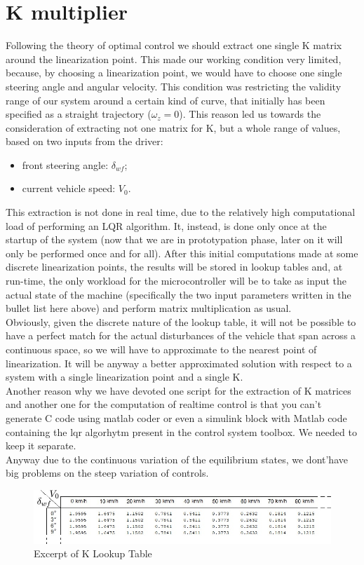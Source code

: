 \section{K multiplier}
Following the theory of optimal control we should extract one single K matrix around the linearization point. This made our working condition very limited, because, by choosing a linearization point, we would have to choose one single steering angle and angular velocity. This condition was restricting the validity range of our system around a certain kind of curve, that initially has been specified as a straight trajectory ($\omega_{z}=0$).
This reason led us towards the consideration of extracting not one matrix for K, but a whole range of values, based on two inputs from the driver:
\begin{itemize}
	\item front steering angle: $\delta_{wf}$;
	\item current vehicle speed: $V_0$.
\end{itemize}	
This extraction is not done in real time, due to the relatively high computational load of performing an LQR algorithm. It, instead, is done only once at the startup of the system (now that we are in prototypation phase, later on it will only be performed once and for all). After this initial computations made at some discrete linearization points, the results will be stored in lookup tables and, at run-time, the only workload for the microcontroller will be to take as input the actual state of the machine (specifically the two input parameters written in the bullet list here above) and perform matrix multiplication as usual.\\
Obviously, given the discrete nature of the lookup table, it will not be possible to have a perfect match for the actual disturbances of the vehicle that span across a continuous space, so we will have to approximate to the nearest point of linearization. It will be anyway a better approximated solution with respect to a system with a single linearization point and a single K.\\
Another reason why we have devoted one script for the extraction of K matrices and another one for the computation of realtime control is that you can't generate C code using matlab coder or even a simulink block with Matlab code containing the lqr algorhytm present in the control system toolbox. We needed to keep it separate.\\
Anyway due to the continuous variation of the equilibrium states, we dont'have big problems on the steep variation of controls.
\begin{figure}[!h]
\includegraphics[width=\linewidth]{../Images/KLut.jpg}\caption{Excerpt of K Lookup Table}
\end{figure}
